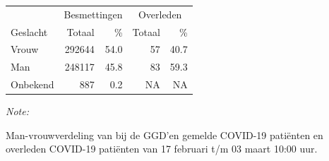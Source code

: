 \documentclass[
  english,
  man,floatsintext]{apa6}
\begin{document}
\newpage

\begin{table}
\centering\begingroup\fontsize{11}{13}\selectfont

\begin{threeparttable}
\begin{tabular}{lrrrr}
\toprule
\multicolumn{1}{c}{ } & \multicolumn{2}{c}{Besmettingen} & \multicolumn{2}{c}{Overleden} \\
\cmidrule(l{3pt}r{3pt}){2-3} \cmidrule(l{3pt}r{3pt}){4-5}
Geslacht & Totaal & \% & Totaal & \%\\
\midrule
Vrouw & 292644 & 54.0 & 57 & 40.7\\
Man & 248117 & 45.8 & 83 & 59.3\\
Onbekend & 887 & 0.2 & NA & NA\\
\bottomrule
\end{tabular}
\begin{tablenotes}
\item \textit{Note: } 
\item Man-vrouwverdeling van bij de GGD’en gemelde COVID-19 patiënten en overleden COVID-19 patiënten van 17 februari t/m 03 maart 10:00 uur.
\end{tablenotes}
\end{threeparttable}
\endgroup{}
\end{table}
\newpage
\end{document}
